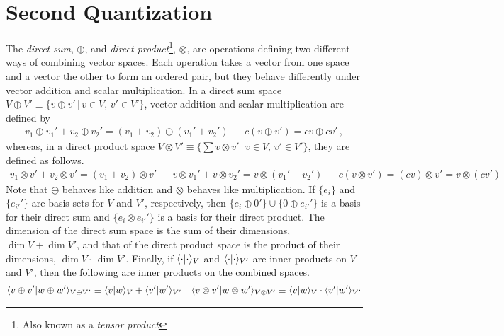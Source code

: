\documentclass[11pt]{article}
\numberwithin{equation}{section}
\begin{document}
\setlength{\abovedisplayskip}{3pt}
\setlength{\belowdisplayskip}{3pt}

\setcounter{section}{2}
\section{Second Quantization}

\begin{dfn}\label{dfn:direct-sum-and-direct-product}
\begin{samepage}
The \textit{direct sum}, $\oplus$, and \textit{direct product}\footnote{Also known as a \textit{tensor product}}, $\otimes$, are operations defining two different ways of combining vector spaces.
Each operation takes a vector from one space and a vector the other to form an ordered pair, but they behave differently under vector addition and scalar multiplication.
In a direct sum space $V\oplus V'\equiv\{v\oplus v'\,|\,v\in V,\,v'\in V'\}$,
vector addition and scalar multiplication are defined by
\begin{align}
  v_1\oplus v_1'
+
  v_2\oplus v_2'
=
  (v_1 + v_2)
\oplus
  (v_1' + v_2')
&&
  c(v\oplus v')
=
  cv\oplus cv'\,,
\end{align}
whereas, in a direct product space $V\otimes V'\equiv\{\sum v\otimes v'\,|\,v\in V,\,v'\in V'\}$, they are defined as follows.
\begin{align}
  v_1\otimes v'
+
  v_2\otimes v'
=
  (v_1 + v_2)\otimes v'
&&
  v\otimes v_1'
+
  v\otimes v_2'
=
  v\otimes(v_1' + v_2')
&&
  c(v\otimes v')
=
  (cv)\otimes v'
=
  v\otimes(cv')
\end{align}
Note that $\oplus$ behaves like addition and $\otimes$ behaves like multiplication.
If $\{e_i\}$ and $\{e_{i'}'\}$ are basis sets for $V$ and $V'$, respectively, then $\{e_i\oplus0'\}\cup\{0\oplus e_{i'}'\}$ is a basis for their direct sum and $\{e_i\otimes e_{i'}'\}$ is a basis for their direct product.
The dimension of the direct sum space is the sum of their dimensions,
$\dim V+\dim V'$,
and that of the direct product space is the product of their dimensions,
$\dim V\cdot \,\dim V'$.
Finally, if $\langle\cdot|\cdot\rangle_V$ and $\langle\cdot|\cdot\rangle_{V'}$ are inner products on $V$ and $V'$, then the following are inner products on the combined spaces.
\begin{align}
  \langle v\oplus v'|w\oplus w'\rangle_{V\oplus V'}
\equiv
  \langle v|w\rangle_V
+
  \langle v'|w'\rangle_{V'}
&&
  \langle v\otimes v'|w\otimes w'\rangle_{V\otimes V'}
\equiv
  \langle v|w\rangle_V
\cdot
  \langle v'|w'\rangle_{V'}
\end{align}
\end{samepage}
\end{dfn}
\end{document}
